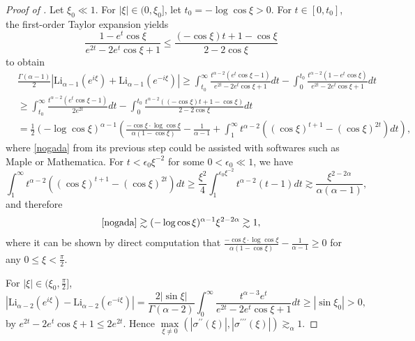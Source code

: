 \documentclass{article}
\numberwithin{equation}{section}
\begin{document}
\begin{proof}[Proof of ]
Let $\xi_0 \ll 1$. For $|\xi| \in (0,\xi_0]$, let $t_0 = -\log \cos \xi > 0$. For $t \in [0,t_0]$, the first-order Taylor expansion yields
\begin{equation*}
\frac{1-e^t \cos \xi}{e^{2t}-2 e^t \cos \xi + 1} \leq \frac{(-\cos\xi) t + 1-\cos\xi}{2 - 2\cos\xi}
\end{equation*}
to obtain
\begin{align}\label{nogada}
&\frac{\Gamma(\alpha-1)}{2}|\mathrm{Li}_{\alpha-1}(e^{i\xi})+\mathrm{Li}_{\alpha-1}(e^{-i\xi})| \geq \int_{t_0}^\infty \frac{t^{\alpha-2}(e^t \cos \xi - 1)}{e^{2t}-2 e^t \cos \xi + 1}dt - \int_0^{t_0} \frac{t^{\alpha-2}( 1-e^t \cos \xi)}{e^{2t}-2 e^t \cos \xi + 1}dt\nonumber\\
&\geq \int_{t_0}^\infty \frac{t^{\alpha-2}(e^t \cos \xi - 1)}{2e^{2t}}dt - \int_{0}^{t_0} \frac{t^{\alpha-2}((-\cos\xi) t + 1-\cos\xi)}{2 - 2\cos\xi}dt\nonumber\\
&=\frac{1}{2}(-\log \cos \xi)^{\alpha-1}\left(\frac{-\cos \xi \cdot\log \cos \xi}{\alpha (1-\cos\xi)} - \frac{1}{\alpha-1} + \int_1^\infty t^{\alpha-2}\left((\cos \xi)^{t+1} - (\cos\xi)^{2t}\right)dt\right),
\end{align}
where \eqref{nogada} from its previous step could be assisted with softwares such as Maple or Mathematica. For $t < \epsilon_0 \xi^{-2}$ for some $0 < \epsilon_0 \ll 1$, we have
\begin{equation*}
    \int_1^\infty t^{\alpha-2}\left((\cos \xi)^{t+1} - (\cos\xi)^{2t}\right)dt \geq \frac{\xi^2}{4} \int_1^{\epsilon_0 \xi^{-2}} t^{\alpha-2} (t-1)dt \gtrsim \frac{\xi^{2-2\alpha}}{\alpha (\alpha-1)},
\end{equation*}
and therefore
\begin{equation*}
    \eqref{nogada} \gtrsim (-\log \cos \xi)^{\alpha-1} \xi^{2-2\alpha} \gtrsim 1,
\end{equation*}
where it can be shown by direct computation that $\frac{-\cos \xi \cdot\log \cos \xi}{\alpha (1-\cos\xi)} - \frac{1}{\alpha-1} \geq 0$ for any $0 \leq \xi < \frac{\pi}{2}$.

For $|\xi| \in (\xi_0,\frac{\pi}{2}]$,
\begin{equation*}
    |\mathrm{Li}_{\alpha-2}(e^{i\xi})-\mathrm{Li}_{\alpha-2}(e^{-i\xi})| = \frac{2 |\sin \xi|}{\Gamma(\alpha-2)}\int_0^\infty \frac{t^{\alpha-3} e^t}{e^{2t}-2 e^t \cos \xi + 1}dt \geq |\sin \xi_0| > 0,
\end{equation*}
by $e^{2t}-2 e^t \cos \xi + 1 \leq 2e^{2t}$. Hence $\max\limits_{\xi \neq 0}(|\sigma^{\prime\prime}(\xi)|,|\sigma^{\prime\prime\prime}(\xi)|) \gtrsim_{\alpha} 1$.


\end{proof}
\end{document}
